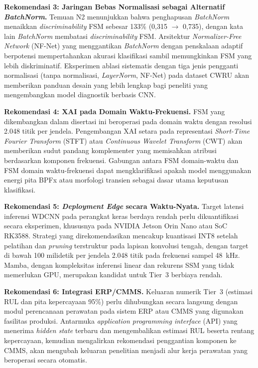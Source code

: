 \textbf{Rekomendasi 3: Jaringan Bebas Normalisasi sebagai Alternatif
\emph{BatchNorm}.} Temuan N2 menunjukkan bahwa {\color{blue}penghapusan
\emph{BatchNorm} menaikkan \emph{discriminability} FSM sebesar 133\% (0,315
$\rightarrow$ 0,735), dengan kata lain \emph{BatchNorm} membatasi
\emph{discriminability} FSM}. Arsitektur \emph{Normalizer-Free
Network} (NF-Net) yang menggantikan \emph{BatchNorm} dengan penskalaan adaptif
berpotensi mempertahankan akurasi klasifikasi sambil memungkinkan FSM yang lebih
diskriminatif. Eksperimen ablasi sistematis dengan tiga jenis pengganti
normalisasi (tanpa normalisasi, \emph{LayerNorm}, NF-Net) pada dataset CWRU
akan memberikan panduan desain yang lebih lengkap bagi peneliti yang
mengembangkan model diagnostik berbasis CNN.

\textbf{Rekomendasi 4: XAI pada Domain Waktu-Frekuensi.} FSM yang dikembangkan
dalam disertasi ini beroperasi pada domain waktu dengan resolusi 2.048 titik
per jendela. Pengembangan XAI setara pada representasi \emph{Short-Time Fourier
Transform} (STFT) atau \emph{Continuous Wavelet Transform} (CWT) akan
memberikan sudut pandang komplementer yang memisahkan atribusi berdasarkan
komponen frekuensi. Gabungan antara FSM domain-waktu dan FSM domain
waktu-frekuensi dapat mengklarifikasi apakah model menggunakan energi pita
BPFx atau morfologi transien sebagai dasar utama keputusan klasifikasi.

\textbf{Rekomendasi 5: \emph{Deployment Edge} secara Waktu-Nyata.} Target
latensi inferensi WDCNN pada perangkat keras berdaya rendah perlu dikuantifikasi
secara eksperimen, khususnya pada NVIDIA Jetson Orin Nano atau SoC RK3588.
Strategi yang direkomendasikan mencakup kuantisasi INT8 setelah pelatihan dan
\emph{pruning} terstruktur pada lapisan konvolusi tengah, dengan target di bawah
100 milidetik per jendela 2.048 titik pada frekuensi sampel 48~kHz. Mamba,
dengan kompleksitas inferensi linear dan rekurens SSM yang tidak memerlukan GPU,
merupakan kandidat untuk Tier~3 berbiaya rendah.

\textbf{Rekomendasi 6: Integrasi ERP/CMMS.} Keluaran numerik Tier~3 (estimasi
RUL dan pita kepercayaan 95\%) perlu dihubungkan secara langsung dengan modul
perencanaan perawatan pada sistem ERP atau CMMS yang digunakan fasilitas
produksi. Antarmuka \emph{application programming interface} (API) yang menerima
\emph{hidden state} terbaru dan mengembalikan estimasi RUL beserta rentang
kepercayaan, kemudian mengalirkan rekomendasi penggantian komponen ke CMMS,
akan mengubah keluaran penelitian menjadi alur kerja perawatan yang beroperasi
secara otomatis.

